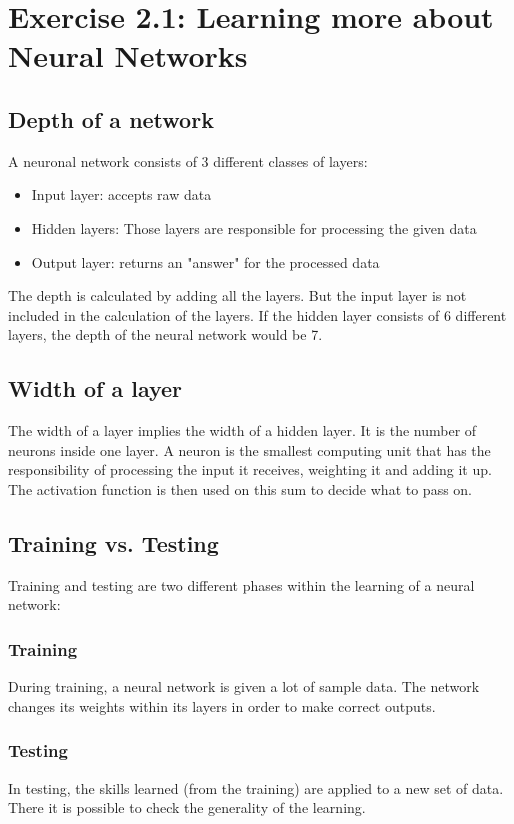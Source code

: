 \documentclass[a4paper]{article}
\begin{document}
\section*{Exercise 2.1: Learning more about Neural Networks}

\subsection*{Depth of a network}
A neuronal network consists of 3 different classes of layers:
\begin{itemize}
    \item Input layer: accepts raw data
    \item Hidden layers: Those layers are responsible for processing the given data
    \item Output layer: returns an "answer" for the processed data
\end{itemize}
The depth is calculated by adding all the layers. But the input layer is not included in the calculation of the layers. If the hidden layer consists of 6 different layers, the depth of the neural network would be 7.

\subsection*{Width of a layer}
The width of a layer implies the width of a hidden layer. It is the number of neurons inside one layer. A neuron is the smallest computing unit that has the responsibility of processing the input it receives, weighting it and adding it up. The activation function is then used on this sum to decide what to pass on.

\subsection*{Training vs. Testing}
Training and testing are two different phases within the learning of a neural network:
\subsubsection*{Training}
During training, a neural network is given a lot of sample data. The network changes its weights within its layers in order to make correct outputs.
\subsubsection*{Testing}
In testing, the skills learned (from the training) are applied to a new set of data. There it is possible to check the generality of the learning.
\end{document}
